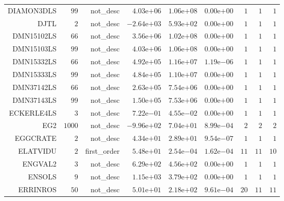 \begin{longtable}{rrrrrrrrr}
DIAMON3DLS & \(    99\) & not\_desc & \( 4.03\)e\(+06\) & \( 1.06\)e\(+08\) & \( 0.00\)e\(+00\) & \(     1\) & \(     1\) & \(     1\) \\
DJTL & \(     2\) & not\_desc & \(-2.64\)e\(+03\) & \( 5.93\)e\(+02\) & \( 0.00\)e\(+00\) & \(     1\) & \(     1\) & \(     1\) \\
DMN15102LS & \(    66\) & not\_desc & \( 3.56\)e\(+06\) & \( 1.02\)e\(+08\) & \( 0.00\)e\(+00\) & \(     1\) & \(     1\) & \(     1\) \\
DMN15103LS & \(    99\) & not\_desc & \( 4.03\)e\(+06\) & \( 1.06\)e\(+08\) & \( 0.00\)e\(+00\) & \(     1\) & \(     1\) & \(     1\) \\
DMN15332LS & \(    66\) & not\_desc & \( 4.92\)e\(+05\) & \( 1.16\)e\(+07\) & \( 1.19\)e\(-06\) & \(     1\) & \(     1\) & \(     1\) \\
DMN15333LS & \(    99\) & not\_desc & \( 4.84\)e\(+05\) & \( 1.10\)e\(+07\) & \( 0.00\)e\(+00\) & \(     1\) & \(     1\) & \(     1\) \\
DMN37142LS & \(    66\) & not\_desc & \( 2.63\)e\(+05\) & \( 7.54\)e\(+06\) & \( 0.00\)e\(+00\) & \(     1\) & \(     1\) & \(     1\) \\
DMN37143LS & \(    99\) & not\_desc & \( 1.50\)e\(+05\) & \( 7.53\)e\(+06\) & \( 0.00\)e\(+00\) & \(     1\) & \(     1\) & \(     1\) \\
ECKERLE4LS & \(     3\) & not\_desc & \( 7.22\)e\(-01\) & \( 4.55\)e\(-02\) & \( 0.00\)e\(+00\) & \(     1\) & \(     1\) & \(     1\) \\
EG2 & \(  1000\) & not\_desc & \(-9.96\)e\(+02\) & \( 7.04\)e\(+01\) & \( 8.99\)e\(-04\) & \(     2\) & \(     2\) & \(     2\) \\
EGGCRATE & \(     2\) & not\_desc & \( 4.34\)e\(+01\) & \( 2.89\)e\(+01\) & \( 9.54\)e\(-07\) & \(     1\) & \(     1\) & \(     1\) \\
ELATVIDU & \(     2\) & first\_order & \( 5.48\)e\(+01\) & \( 2.54\)e\(-04\) & \( 1.62\)e\(-04\) & \(    11\) & \(    11\) & \(    10\) \\
ENGVAL2 & \(     3\) & not\_desc & \( 6.29\)e\(+02\) & \( 4.56\)e\(+02\) & \( 0.00\)e\(+00\) & \(     1\) & \(     1\) & \(     1\) \\
ENSOLS & \(     9\) & not\_desc & \( 1.15\)e\(+03\) & \( 3.79\)e\(+02\) & \( 0.00\)e\(+00\) & \(     1\) & \(     1\) & \(     1\) \\
ERRINROS & \(    50\) & not\_desc & \( 5.01\)e\(+01\) & \( 2.18\)e\(+02\) & \( 9.61\)e\(-04\) & \(    20\) & \(    11\) & \(    11\) \\

\end{longtable}
